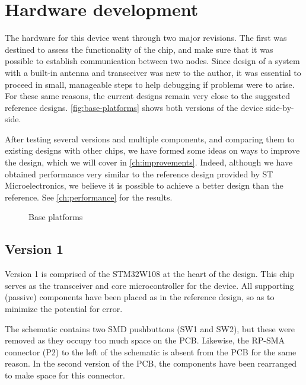 \chapter{Hardware development}\label{ch:examples}

The hardware for this device went through two major revisions. The first was
destined to assess the functionality of the chip, and make sure that it was
possible to establish communication between two nodes. Since design of a system
with a built-in antenna and transceiver was new to the author, it was essential
to proceed in small, manageable steps to help debugging if problems were to
arise. For these same reasons, the current designs remain very close to the
suggested reference designs. \autoref{fig:base-platforms} shows both versions of
the device side-by-side.

After testing several versions and multiple components, and comparing them to
existing designs with other chips, we have formed some ideas on ways to improve
the design, which we will cover in \autoref{ch:improvements}.
Indeed, although we have obtained performance very similar to the reference
design provided by ST Microelectronics, we believe it is possible to achieve
a better design than the reference. See \autoref{ch:performance} for the
results.

\begin{figure}[bth]
  \myfloatalign
  \caption{Base platforms}
  \label{fig:base-platforms}
\end{figure}


\section{Version 1}

Version 1 is comprised of the STM32W108 at the heart of the design. This chip
serves as the transceiver and core microcontroller for the device. All
supporting (passive) components have been placed as in the reference design, so
as to minimize the potential for error. 

The schematic contains two SMD pushbuttons (SW1 and SW2), but these were removed
as they occupy too much space on the PCB. Likewise, the RP-SMA connector (P2) to
the left of the schematic is absent from the PCB for the same reason. In the
second version of the PCB, the components have been rearranged to make space for
this connector.

